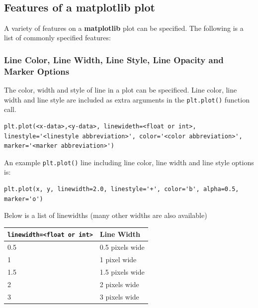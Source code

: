 \documentclass{book}
\begin{document}
    \begin{center}
    \end{center}
    { \hspace*{\fill} \\}
    
    \subsection{Features of a matplotlib
plot}\label{features-of-a-matplotlib-plot}

    A variety of features on a \textbf{matplotlib} plot can be specified.
The following is a list of commonly specified features:

    \subsubsection{Line Color, Line Width, Line Style, Line Opacity and
Marker
Options}\label{line-color-line-width-line-style-line-opacity-and-marker-options}

The color, width and style of line in a plot can be specificed. Line
color, line width and line style are included as extra arguments in the
\lstinline!plt.plot()! function call.

\begin{lstlisting}
plt.plot(<x-data>,<y-data>, linewideth=<float or int>, linestyle='<linestyle abbreviation>', color='<color abbreviation>', marker='<marker abbreviation>')
\end{lstlisting}

An example \lstinline!plt.plot()! line including line color, line width
and line style options is:

\begin{lstlisting}
plt.plot(x, y, linewidth=2.0, linestyle='+', color='b', alpha=0.5, marker='o')
\end{lstlisting}

Below is a list of linewidths (many other widths are also available)

\begin{longtable}[]{@{}ll@{}}
\toprule
\lstinline!linewidth=<float or int>! & Line Width\tabularnewline
\midrule
\endhead
0.5 & 0.5 pixels wide\tabularnewline
1 & 1 pixel wide\tabularnewline
1.5 & 1.5 pixels wide\tabularnewline
2 & 2 pixels wide\tabularnewline
3 & 3 pixels wide\tabularnewline
\bottomrule
\end{longtable}
\end{document}
